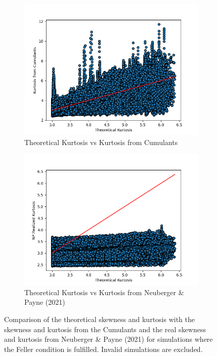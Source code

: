 \begin{figure}
    \bigskip %
    \begin{subfigure}[b]{0.4\textwidth}
        \centering
        \includegraphics[width=\textwidth]{img/theoretical_kurtosis_vs_kurtosis_from_cumulants_feller_condition_true.png}
        \caption{Theoretical Kurtosis vs Kurtosis from Cumulants}
    \end{subfigure}
    \hfill
    \begin{subfigure}[b]{0.4\textwidth}
        \centering
        \includegraphics[width=\textwidth]{img/theoretical_kurtosis_vs_NP_rexcess_kurtosis_feller_condition_true.png}
        \caption{Theoretical Kurtosis vs Kurtosis from Neuberger \& Payne (2021)}
    \end{subfigure}
    \caption{Comparison of the theoretical skewness and kurtosis with the skewness and kurtosis from the Cumulants and the real skewness and kurtosis from Neuberger \& Payne (2021) for simulations where the Feller condition is fulfilled. Invalid simulations are excluded.}
    \label{fig:theoretical_vs_real_skewness_kurtosis}
\end{figure}

